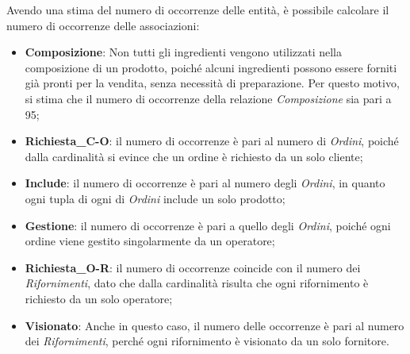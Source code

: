 \documentclass[12pt,a4paper]{article}
\begin{document}
    \vspace{8pt}
    \noindent
    Avendo una stima del numero di occorrenze delle entità, è possibile calcolare il numero di occorrenze delle associazioni:
    \begin{itemize}[leftmargin=1em]
        \item \textbf{Composizione}: Non tutti gli ingredienti vengono utilizzati nella composizione di un prodotto, poiché alcuni ingredienti possono essere forniti già pronti per la vendita, senza necessità di preparazione. Per questo motivo, si stima che il numero di occorrenze della relazione \textit{Composizione} sia pari a 95;
        \item  \textbf{Richiesta\_C-O}: il numero di occorrenze è pari al numero di \textit{Ordini}, poiché dalla cardinalità si evince che un ordine è richiesto da un solo cliente;
        \item \textbf{Include}: il numero di occorrenze è pari al numero degli \textit{Ordini}, in quanto ogni tupla di ogni  di \textit{Ordini} include un solo prodotto;
        \item \textbf{Gestione}: il numero di occorrenze è pari a quello degli \textit{Ordini}, poiché ogni ordine viene gestito singolarmente da un operatore;
        \item \textbf{Richiesta\_O-R}: il numero di occorrenze coincide con il numero dei \textit{Rifornimenti}, dato che dalla cardinalità risulta che ogni rifornimento è richiesto da un solo operatore;
        \item \textbf{Visionato}: Anche in questo caso, il numero delle occorrenze è pari al numero dei \textit{Rifornimenti},  perché ogni rifornimento è visionato da un solo fornitore.
    \end{itemize}
\end{document}
